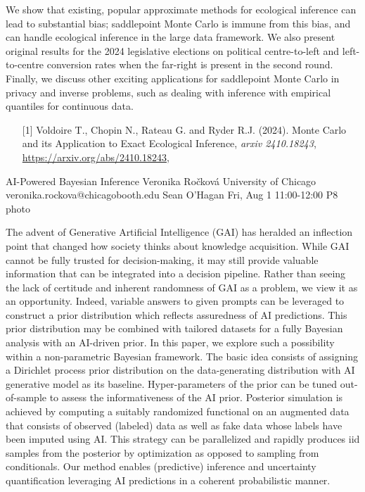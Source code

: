 \begin{talk}
We show that existing, popular approximate methods for ecological inference can
lead to substantial bias; saddlepoint Monte Carlo is immune from this bias, and 
can handle ecological inference in the large data framework. We also
present original results for the 2024 legislative elections on political
centre-to-left and left-to-centre conversion rates when the far-right is
present in the second round. Finally, we discuss other exciting applications
for saddlepoint Monte Carlo in privacy and inverse problems, such as dealing
with inference with empirical quantiles for continuous data.

\medskip

\begin{enumerate}
	\item[{[1]}] 
      Voldoire T., Chopin N., Rateau G. and Ryder R.J. (2024).
      Monte Carlo and its Application to Exact Ecological Inference, 
      \textit{arxiv 2410.18243},
      \url{https://arxiv.org/abs/2410.18243}, 
\end{enumerate}
\vspace{-10ex}
\end{talk}

\clearpage
\begin{talk}
  {AI-Powered Bayesian Inference}%
  {Veronika Ročková}%
  {University of Chicago}%
  {veronika.rockova@chicagobooth.edu}%
  {Sean O'Hagan}%
  {}%
  {Fri, Aug 1 11:00-12:00}%
  {P8}%
  {photo}%
  
				
			
The advent of Generative Artificial Intelligence (GAI) has heralded an inflection point that changed how society thinks about knowledge acquisition. While GAI cannot be fully trusted for decision-making, it may still provide valuable information that can be integrated into a decision pipeline. Rather than seeing the lack of certitude and inherent randomness of GAI as a problem, we view it as an opportunity. Indeed, variable answers to given prompts can be leveraged to construct a prior distribution which reflects assuredness of AI predictions. This prior distribution may be combined with tailored datasets for a fully Bayesian analysis with an AI-driven prior. In this paper, we explore such a possibility within a non-parametric Bayesian framework. The basic idea consists of assigning a Dirichlet process prior distribution on the data-generating distribution with AI generative model as its baseline. Hyper-parameters of the prior can be tuned out-of-sample to assess the informativeness of the AI prior. Posterior simulation is achieved by computing a suitably randomized functional on an augmented data that consists of observed (labeled) data as well as fake data whose labels have been imputed using AI. This strategy can be parallelized and rapidly produces iid samples from the posterior by optimization as opposed to sampling from conditionals. Our method enables (predictive) inference and uncertainty quantification leveraging AI predictions in a coherent probabilistic manner.

\medskip

\end{talk}

